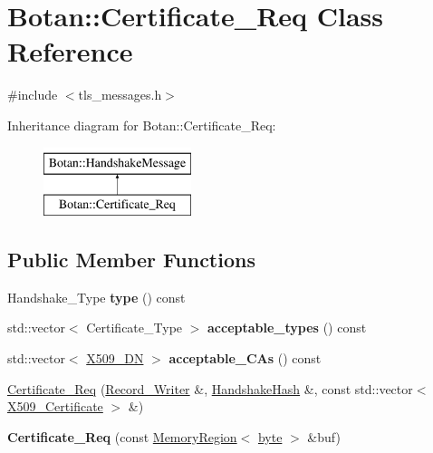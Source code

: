 \hypertarget{classBotan_1_1Certificate__Req}{\section{Botan\-:\-:Certificate\-\_\-\-Req Class Reference}
\label{classBotan_1_1Certificate__Req}
}


{\ttfamily \#include $<$tls\-\_\-messages.\-h$>$}

Inheritance diagram for Botan\-:\-:Certificate\-\_\-\-Req\-:\begin{figure}[H]
\begin{center}
\leavevmode
\includegraphics[height=2.000000cm]{classBotan_1_1Certificate__Req}
\end{center}
\end{figure}
\subsection*{Public Member Functions}
\begin{DoxyCompactItemize}
\item 
\hypertarget{classBotan_1_1Certificate__Req_aa87348c626b4ca080015ab14e9155979}{Handshake\-\_\-\-Type {\bfseries type} () const }\label{classBotan_1_1Certificate__Req_aa87348c626b4ca080015ab14e9155979}

\item 
\hypertarget{classBotan_1_1Certificate__Req_a75b325c41140da5e3655bddaee3308e1}{std\-::vector$<$ Certificate\-\_\-\-Type $>$ {\bfseries acceptable\-\_\-types} () const }\label{classBotan_1_1Certificate__Req_a75b325c41140da5e3655bddaee3308e1}

\item 
\hypertarget{classBotan_1_1Certificate__Req_aa60078002be7f8a9ecf9b08945b82860}{std\-::vector$<$ \hyperlink{classBotan_1_1X509__DN}{X509\-\_\-\-D\-N} $>$ {\bfseries acceptable\-\_\-\-C\-As} () const }\label{classBotan_1_1Certificate__Req_aa60078002be7f8a9ecf9b08945b82860}

\item 
\hyperlink{classBotan_1_1Certificate__Req_a174a68d7d65a363ca4bceadee387f6ff}{Certificate\-\_\-\-Req} (\hyperlink{classBotan_1_1Record__Writer}{Record\-\_\-\-Writer} \&, \hyperlink{classBotan_1_1HandshakeHash}{Handshake\-Hash} \&, const std\-::vector$<$ \hyperlink{classBotan_1_1X509__Certificate}{X509\-\_\-\-Certificate} $>$ \&)
\item 
\hypertarget{classBotan_1_1Certificate__Req_ad01e5ffc73473c232b1af759860f2384}{{\bfseries Certificate\-\_\-\-Req} (const \hyperlink{classBotan_1_1MemoryRegion}{Memory\-Region}$<$ \hyperlink{namespaceBotan_a7d793989d801281df48c6b19616b8b84}{byte} $>$ \&buf)}\label{classBotan_1_1Certificate__Req_ad01e5ffc73473c232b1af759860f2384}

\end{DoxyCompactItemize}


